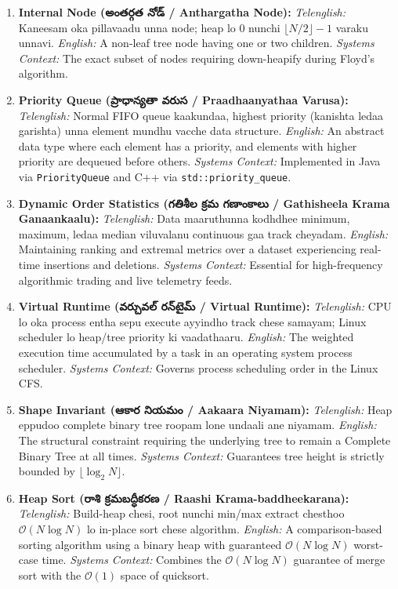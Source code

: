\documentclass[10pt,twocolumn,letterpaper]{article}
\begin{document}
\begin{enumerate}
    \item \textbf{Internal Node (అంతర్గత నోడ్ / Anthargatha Node):}
    \textit{Telenglish:} Kaneesam oka pillavaadu unna node; heap lo $0$ nunchi $\lfloor N/2 \rfloor - 1$ varaku unnavi.
    \textit{English:} A non-leaf tree node having one or two children.
    \textit{Systems Context:} The exact subset of nodes requiring down-heapify during Floyd's algorithm.

    \item \textbf{Priority Queue (ప్రాధాన్యతా వరుస / Praadhaanyathaa Varusa):}
    \textit{Telenglish:} Normal FIFO queue kaakundaa, highest priority (kanishta ledaa garishta) unna element mundhu vacche data structure.
    \textit{English:} An abstract data type where each element has a priority, and elements with higher priority are dequeued before others.
    \textit{Systems Context:} Implemented in Java via \texttt{PriorityQueue} and C++ via \texttt{std::priority\_queue}.

    \item \textbf{Dynamic Order Statistics (గతిశీల క్రమ గణాంకాలు / Gathisheela Krama Ganaankaalu):}
    \textit{Telenglish:} Data maaruthunna kodhdhee minimum, maximum, ledaa median viluvalanu continuous gaa track cheyadam.
    \textit{English:} Maintaining ranking and extremal metrics over a dataset experiencing real-time insertions and deletions.
    \textit{Systems Context:} Essential for high-frequency algorithmic trading and live telemetry feeds.

    \item \textbf{Virtual Runtime (వర్చువల్ రన్‌టైమ్ / Virtual Runtime):}
    \textit{Telenglish:} CPU lo oka process entha sepu execute ayyindho track chese samayam; Linux scheduler lo heap/tree priority ki vaadathaaru.
    \textit{English:} The weighted execution time accumulated by a task in an operating system process scheduler.
    \textit{Systems Context:} Governs process scheduling order in the Linux CFS.

    \item \textbf{Shape Invariant (ఆకార నియమం / Aakaara Niyamam):}
    \textit{Telenglish:} Heap eppudoo complete binary tree roopam lone undaali ane niyamam.
    \textit{English:} The structural constraint requiring the underlying tree to remain a Complete Binary Tree at all times.
    \textit{Systems Context:} Guarantees tree height is strictly bounded by $\lfloor \log_2 N \rfloor$.

    \item \textbf{Heap Sort (రాశి క్రమబద్ధీకరణ / Raashi Krama-baddheekarana):}
    \textit{Telenglish:} Build-heap chesi, root nunchi min/max extract chesthoo $\mathcal{O}(N \log N)$ lo in-place sort chese algorithm.
    \textit{English:} A comparison-based sorting algorithm using a binary heap with guaranteed $\mathcal{O}(N \log N)$ worst-case time.
    \textit{Systems Context:} Combines the $\mathcal{O}(N \log N)$ guarantee of merge sort with the $\mathcal{O}(1)$ space of quicksort.
\end{enumerate}
\end{document}
